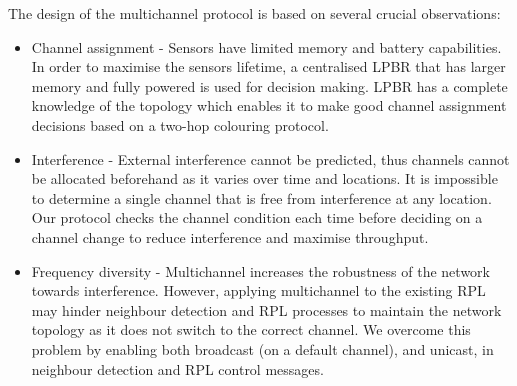 The design of the multichannel protocol is based on several crucial observations:
\begin{itemize}
\item Channel assignment - Sensors have limited memory and battery capabilities. In order to maximise the sensors lifetime, a centralised LPBR that has larger memory and fully powered is used for decision making. LPBR has a complete knowledge of the topology which enables it to make good channel assignment decisions based on a two-hop colouring protocol.

\item Interference - External interference cannot be predicted, thus channels cannot be allocated beforehand as it varies over time and locations. It is impossible to determine a single channel that is free from interference at any location. Our protocol checks the channel condition each time before deciding on a channel change to reduce interference and maximise throughput.

\item Frequency diversity - Multichannel increases the robustness of the network towards interference. However, applying multichannel to the existing RPL may hinder neighbour detection and RPL processes to maintain the network topology as it does not switch to the correct channel. We overcome this problem by enabling both broadcast (on a default channel), and unicast, in neighbour detection and RPL control messages. 



\end{itemize}

